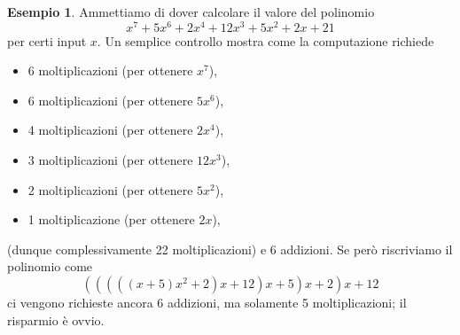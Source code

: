 \documentclass[12pt,a4paper]{report}
\theoremstyle{definition}
\newtheorem{es}[teo]{Esempio}  %
\begin{document}
\begin{es}
Ammettiamo di dover calcolare il valore del polinomio
$$x^7+5x^6+2x^4+12x^3+5x^2+2x+21$$
per certi input $x$. Un semplice controllo mostra come la computazione richiede 
\begin{itemize}
\item 6 moltiplicazioni (per ottenere $x^7$),
\item 6 moltiplicazioni (per ottenere $5x^6$),
\item 4 moltiplicazioni (per ottenere $2x^4$),
\item 3 moltiplicazioni (per ottenere $12x^3$),
\item 2 moltiplicazioni (per ottenere $5x^2$),
\item 1 moltiplicazione (per ottenere $2x$),
\end{itemize}
(dunque complessivamente 22 moltiplicazioni) e 6 addizioni. Se però riscriviamo il polinomio come
$$(((((x+5)x^2+2)x+12)x+5)x+2)x+12$$
ci vengono richieste ancora 6 addizioni, ma solamente 5 moltiplicazioni; il risparmio è ovvio.
\end{es}
\end{document}
